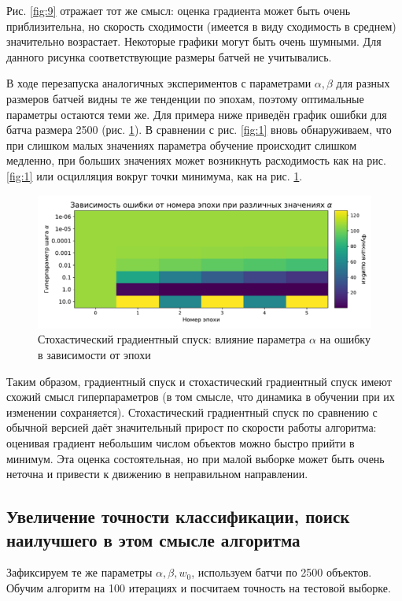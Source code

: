 \documentclass{article}
\begin{document}
                Рис. \ref{fig:9} отражает тот же смысл: оценка градиента может быть очень приблизительна, но скорость сходимости (имеется в виду сходимость в среднем) значительно возрастает. Некоторые графики могут быть очень шумными. Для данного рисунка соответствующие размеры батчей не учитывались.
                
                В ходе перезапуска аналогичных экспериментов с параметрами $\alpha, \beta$ для разных размеров батчей видны те же тенденции по эпохам, поэтому оптимальные параметры остаются теми же. Для примера ниже приведён график ошибки для батча размера 2500 (рис. \ref{fig:10}). В сравнении с рис. \ref{fig:1} вновь обнаруживаем, что при слишком малых значениях параметра обучение происходит слишком медленно, при больших значениях может возникнуть расходимость как на рис. \ref{fig:1} или осцилляция вокруг точки минимума, как на рис. \ref{fig:10}.
                \begin{figure}[H]
                    \centering
                    \includegraphics[width=0.8\linewidth]{./pictures/GDbatch2500_func.pdf}
                    \caption{Стохастический градиентный спуск: влияние параметра $\alpha$ на ошибку в зависимости от эпохи}
                    \label{fig:10}
                \end{figure}

                Таким образом, градиентный спуск и стохастический градиентный спуск имеют схожий смысл гиперпараметров (в том смысле, что динамика в обучении при их изменении сохраняется). Стохастический градиентный спуск по сравнению с обычной версией даёт значительный прирост по скорости работы алгоритма: оценивая градиент небольшим числом объектов можно быстро прийти в минимум. Эта оценка состоятельная, но при малой выборке может быть очень неточна и привести к движению в неправильном направлении.

        \subsection{Увеличение точности классификации, поиск наилучшего в этом смысле алгоритма}
            Зафиксируем те же параметры $\alpha, \beta, w_0$, используем батчи по 2500 объектов. Обучим алгоритм на 100 итерациях и посчитаем точность на тестовой выборке.
\end{document}
